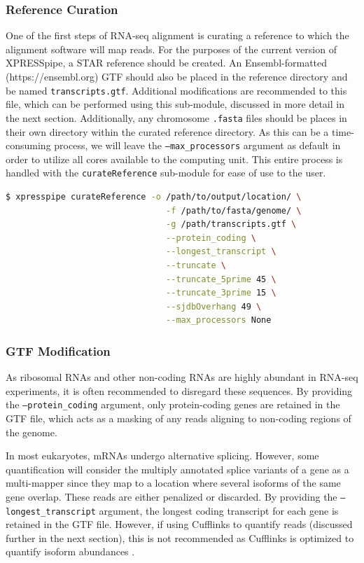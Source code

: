 \documentclass[11pt, a4paper, oneside]{article}
\begin{document}
\subsubsection{Reference Curation}
One of the first steps of RNA-seq alignment is curating a reference to which the alignment software will map reads. For the purposes of the current version of XPRESSpipe, a STAR \cite{star} reference should be created. An Ensembl-formatted (https://ensembl.org) GTF should also be placed in the reference directory and be named \texttt{transcripts.gtf}. Additional modifications are recommended to this file, which can be performed using this sub-module, discussed in more detail in the next section. Additionally, any chromosome \texttt{.fasta} files should be places in their own directory within the curated reference directory. As this can be a time-consuming process, we will leave the \texttt{--max\_processors} argument as default in order to utilize all cores available to the computing unit. This entire process is handled with the \texttt{curateReference} sub-module for ease of use to the user.
\newline
\begin{lstlisting}[language=bash, caption=curateReference example]
$ xpresspipe curateReference -o /path/to/output/location/ \
                                -f /path/to/fasta/genome/ \
                                -g /path/transcripts.gtf \
                                --protein_coding \
                                --longest_transcript \
                                --truncate \
                                --truncate_5prime 45 \
                                --truncate_3prime 15 \
                                --sjdbOverhang 49 \
                                --max_processors None
\end{lstlisting}


\subsubsection{GTF Modification}
As ribosomal RNAs and other non-coding RNAs are highly abundant in RNA-seq experiments, it is often recommended to disregard these sequences. By providing the \texttt{--protein\_coding} argument, only protein-coding genes are retained in the GTF file, which acts as a masking of any reads aligning to non-coding regions of the genome.

In most eukaryotes, mRNAs undergo alternative splicing. However, some quantification will consider the multiply annotated splice variants of a gene as a multi-mapper since they map to a location where several isoforms of the same gene overlap. These reads are either penalized or discarded. By providing the \texttt{--longest\_transcript} argument, the longest coding transcript for each gene is retained in the GTF file. However, if using Cufflinks to quantify reads (discussed further in the next section), this is not recommended as Cufflinks is optimized to quantify isoform abundances \cite{cufflinks}.
\end{document}
